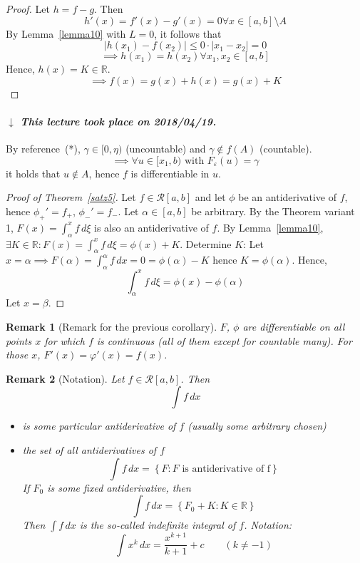 \documentclass{article}
\newtheorem{remark}{Remark}  \numberwithin{remark}{section}
\newcommand{\set}[1]{\left\{#1\right\}}
\newcommand{\card}[1]{\left|#1\right|}
\newcommand{\dateref}[1]{%
  \begin{mdframed}[backgroundcolor=gray!10,innerbottommargin=0pt,innertopmargin=0pt]
    \paragraph{\textit{$\downarrow$ This lecture took place on #1.}}%
  \end{mdframed}%
}
\begin{document}
\begin{proof}
  Let $h = f - g$. Then
  \[ h'(x) = f'(x) - g'(x) = 0 \forall x \in [a,b] \setminus A \]
  By Lemma~\ref{lemma10} with $L = 0$, it follows that
  \[ \card{h(x_1) - f(x_2)} \leq 0 \cdot \card{x_1 - x_2} = 0 \]
  \[ \implies h(x_1) = h(x_2) \forall x_1, x_2 \in [a,b] \]
  Hence, $h(x) = K \in \mathbb R$.
  \[ \implies f(x) = g(x) + h(x) = g(x) + K \]
\end{proof}

\dateref{2018/04/19}

By reference~(*), $\gamma \in [0, \eta)$ (uncountable) and $\gamma \not\in f(A)$ (countable).
\[ \implies \forall u \in [x_1, b) \text{ with } F_{\varepsilon}(u) = \gamma \]
it holds that $u \not\in A$, hence $f$ is differentiable in $u$.

\begin{proof}[Proof of Theorem~\ref{satz5}]
  Let $f \in \mathcal R[a,b]$ and let $\phi$ be an antiderivative of $f$,
  hence $\phi_+' = f_+$, $\phi_-' = f_-$. Let $\alpha \in [a,b]$ be arbitrary.
  By the Theorem variant 1, $F(x) = \int_{\alpha}^x f \, d\xi$ is also an antiderivative of $f$.
  By Lemma~\ref{lemma10}, $\exists K \in \mathbb R: F(x) = \int_{\alpha}^x f \, d\xi = \phi(x) + K$.
  Determine $K$: Let $x = \alpha \implies F(\alpha) = \int_\alpha^\alpha f \, dx = 0 = \phi(\alpha) - K$
  hence $K = \phi(\alpha)$. Hence,
  \[ \int_\alpha^x f \, d\xi = \phi(x) - \phi(\alpha) \]
  Let $x = \beta$.
\end{proof}

\begin{remark}[Remark for the previous corollary]
  $F$, $\phi$ are differentiable on all points $x$ for which $f$ is continuous
  (all of them except for countable many).
  For those $x$, $F'(x) = \varphi'(x) = f(x)$.
\end{remark}

\begin{remark}[Notation]
  Let $f \in \mathcal R[a,b]$. Then
  \[ \int f \, dx \]
  \begin{itemize}
    \item is some particular antiderivative of $f$ (usually some arbitrary chosen)
    \item the set of \emph{all} antiderivatives of $f$
      \[ \int f \, dx = \set{F: F \text{ is antiderivative of f}} \]
      If $F_0$ is some fixed antiderivative, then
      \[ \int f \, dx = \set{F_0 + K: K \in \mathbb R} \]
      Then $\int f \, dx$ is the so-called \emph{indefinite integral of $f$}.
      Notation:
      \[ \int x^k \, dx = \frac{x^{k+1}}{k+1} + c \qquad (k \neq -1) \]
  \end{itemize}
\end{remark}
\end{document}
